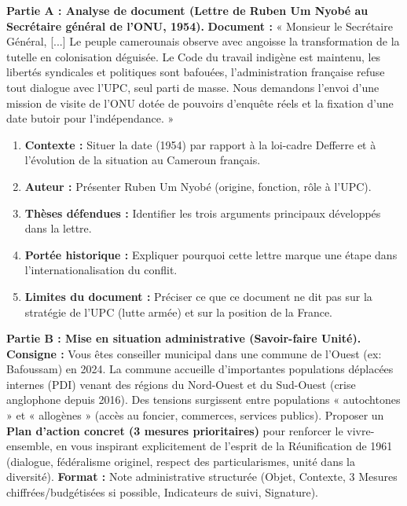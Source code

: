 \documentclass[11pt]{article}
\begin{document}
\begin{exercice}
\textbf{Partie A : Analyse de document (Lettre de Ruben Um Nyobé au Secrétaire général de l'ONU, 1954).}
\textbf{Document :} « Monsieur le Secrétaire Général, [...] Le peuple camerounais observe avec angoisse la transformation de la tutelle en colonisation déguisée. Le Code du travail indigène est maintenu, les libertés syndicales et politiques sont bafouées, l'administration française refuse tout dialogue avec l'UPC, seul parti de masse. Nous demandons l'envoi d'une mission de visite de l'ONU dotée de pouvoirs d'enquête réels et la fixation d'une date butoir pour l'indépendance. »

\begin{enumerate}
\item \textbf{Contexte :} Situer la date (1954) par rapport à la loi-cadre Defferre et à l'évolution de la situation au Cameroun français.
\item \textbf{Auteur :} Présenter Ruben Um Nyobé (origine, fonction, rôle à l'UPC).
\item \textbf{Thèses défendues :} Identifier les trois arguments principaux développés dans la lettre.
\item \textbf{Portée historique :} Expliquer pourquoi cette lettre marque une étape dans l'internationalisation du conflit.
\item \textbf{Limites du document :} Préciser ce que ce document ne dit pas sur la stratégie de l'UPC (lutte armée) et sur la position de la France.
\end{enumerate}

\textbf{Partie B : Mise en situation administrative (Savoir-faire Unité).}
\textbf{Consigne :} Vous êtes conseiller municipal dans une commune de l'Ouest (ex: Bafoussam) en 2024. La commune accueille d'importantes populations déplacées internes (PDI) venant des régions du Nord-Ouest et du Sud-Ouest (crise anglophone depuis 2016). Des tensions surgissent entre populations « autochtones » et « allogènes » (accès au foncier, commerces, services publics).
Proposer un \textbf{Plan d'action concret (3 mesures prioritaires)} pour renforcer le vivre-ensemble, en vous inspirant explicitement de l'esprit de la Réunification de 1961 (dialogue, fédéralisme originel, respect des particularismes, unité dans la diversité).
\textbf{Format :} Note administrative structurée (Objet, Contexte, 3 Mesures chiffrées/budgétisées si possible, Indicateurs de suivi, Signature).
\end{exercice}
\end{document}
